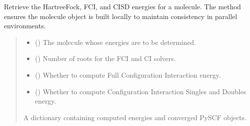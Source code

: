 \documentclass[letterpaper,10pt,english]{sphinxmanual}
\begin{document}
\begin{fulllineitems}
\label{\detokenize{api:MSTOOptpar.getEnergies}}
\pysigstartsignatures
\pysiglinewithargsret
{}
{\sphinxparamcomma {}\sphinxparamcomma {}\sphinxparamcomma {}}
{}
\pysigstopsignatures
\sphinxAtStartPar
Retrieve the Hartree\sphinxhyphen{}Fock, FCI, and CISD energies for a molecule.
The method ensures the molecule object is built locally to maintain
consistency in parallel environments.
\begin{quote}\begin{description}
\begin{itemize}
\item {} 
\sphinxAtStartPar
{} () \textendash{} The molecule whose energies are to be determined.

\item {} 
\sphinxAtStartPar
{} (\sphinxstyleliteralemphasis{\sphinxupquote{, }}) \textendash{} Number of roots for the FCI and CI solvers.

\item {} 
\sphinxAtStartPar
{} (\sphinxstyleliteralemphasis{\sphinxupquote{, }}) \textendash{} Whether to compute Full Configuration Interaction energy.

\item {} 
\sphinxAtStartPar
{} (\sphinxstyleliteralemphasis{\sphinxupquote{, }}) \textendash{} Whether to compute Configuration Interaction Singles and Doubles energy.

\end{itemize}

\sphinxAtStartPar
A dictionary containing computed energies and converged PySCF objects.


\end{description}
\end{quote}
\end{fulllineitems}
\end{document}

